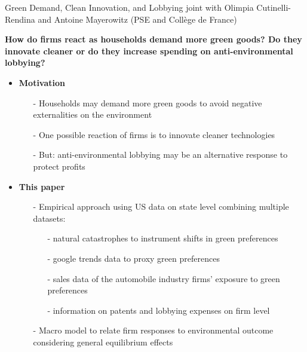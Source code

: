 \begin{frame}{Green Demand, Clean Innovation, and Lobbying}
	\vspace{-5mm}
\hspace{-6mm}\footnotesize{joint with Olimpia Cutinelli-Rendina and Antoine Mayerowitz (PSE and Collège de France)}\\
\pause

\footnotesize
\vspace{2mm}
\textbf{\alert{How do firms react as households demand more green goods? Do they innovate cleaner or do they increase spending on anti-environmental lobbying?}}
\pause
\vspace{-1.5mm}
\begin{itemize}[<+->]
 \item \textbf{Motivation }
 \begin{itemize}
 	\item[-] Households may demand more green goods to avoid negative externalities on the environment \footnotesize{\citep{Benabou2010IndividualResponsibility, Bartling2015DoResponsibility}}
 	\item[-] One possible reaction of firms is to innovate cleaner technologies \footnotesize{\citep{Aghion2021EnvironmentalDirty}}
 	\item[-] But: anti-environmental lobbying may be an alternative response to protect profits
 \end{itemize}
\item \textbf{This paper}
\begin{itemize}
	\item[-] Empirical approach using US data on state level combining multiple datasets:
	\begin{itemize}
		\item[-] natural catastrophes to instrument shifts in green preferences
		\item[-] google trends data to proxy green preferences
		\item[-] sales data of the automobile industry \ar firms' exposure to green preferences
		\item[-] information on patents and lobbying expenses on firm level
	\end{itemize}
\item[-] Macro model to relate firm responses to environmental outcome considering general equilibrium effects %
\end{itemize}
\end{itemize}
\end{frame}


